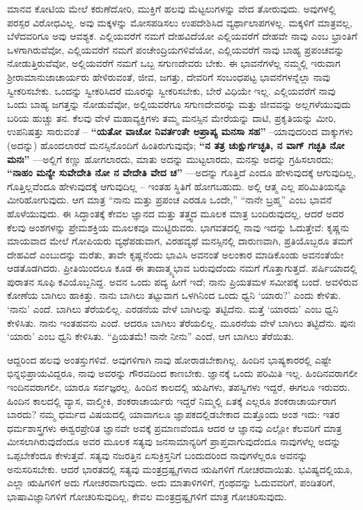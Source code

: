 \newpage

ಮಾನವ ಕೋಟಿಯ ಮೇಲೆ ಕರುಣೆದೋರಿ, ಮುಕ್ತಿಗೆ ಹಲವು ಮೆಟ್ಟಲುಗಳನ್ನು ವೇದ ತೋರುವುದು. ಅವುಗಳಲ್ಲಿ ಪರಸ್ಪರ ವಿರೋಧವಿಲ್ಲ. ಅವು ಮಕ್ಕಳನ್ನು ಮೋಸಪಡಿಸಲು ಉಪದೇಶಿಸಿದ ವ್ಯರ್ಥಾಲಾಪಗಳಲ್ಲ. ಮಕ್ಕಳಿಗೆ ಮಾತ್ರವಲ್ಲ, ಬೆಳೆದವರಿಗೂ ಅವು ಆವಶ್ಯಕ. ಎಲ್ಲಿಯವರೆಗೆ ನಮಗೆ ದೇಹವಿದೆಯೋ ಎಲ್ಲಿಯವರೆಗೆ ದೇಹವೇ ನಾವು ಎಂಬ ಭ್ರಾಂತಿಗೆ ಒಳಗಾಗಿರುವೆವೋ, ಎಲ್ಲಿಯವರೆಗೆ ನಮಗೆ ಪಂಚೇಂದ್ರಿಯಗಳಿವೆಯೋ, ಎಲ್ಲಿಯವರೆಗೆ ನಾವು ಬಾಹ್ಯ ಪ್ರಪಂಚವನ್ನು ನೋಡುತ್ತಿರುವೆವೋ, ಅಲ್ಲಿಯವರೆಗೆ ನಮಗೆ ಒಬ್ಬ ಸಗುಣದೇವರು ಬೇಕು. ಈ ಭಾವನೆಗಳೆಲ್ಲ ನಮ್ಮಲ್ಲಿ ಇರುವಾಗ ಶ‍್ರೀರಾಮಾನುಜಾಚಾರ್ಯರು ಹೇಳಿರುವಂತೆ, ಜೀವ, ಜಗತ್ತು, ದೇವರಿಗೆ ಸಂಬಂಧಪಟ್ಟ ಭಾವನೆಗಳನ್ನೆಲ್ಲಾ ನಾವು ಸ್ವೀಕರಿಸಬೇಕು. ಒಂದನ್ನು ಸ್ವೀಕರಿಸಿದರೆ ಮೂರನ್ನು ಸ್ವೀಕರಿಸಬೇಕು, ಬೇರೆ ವಿಧಿಯೇ ಇಲ್ಲ. ಎಲ್ಲಿಯವರೆಗೆ ನಾವು ಒಂದು ಬಾಹ್ಯ ಜಗತ್ತನ್ನು ನೋಡುವೆವೋ, ಅಲ್ಲಿಯವರೆಗೂ ಸಗುಣದೇವರನ್ನು ಮತ್ತು ಜೀವವನ್ನು ಅಲ್ಲಗಳೆಯುವುದು ಬರಿಯ ಹುಚ್ಚು ತನ. ಕೆಲವು ವೇಳೆ ಮಹಾವ್ಯಕ್ತಿಗಳು ತಮ್ಮ ಮನಸ್ಸಿನ ಮೇರೆಯನ್ನು ದಾಟಿ, ಪ್ರಕೃತಿಯನ್ನು ಮೀರಿ, ಉಪನಿಷತ್ತು ಸಾರುವಂತೆ – \textbf{“ಯತೋ ವಾಚೋ ನಿವರ್ತಂತೇ ಅಪ್ರಾಪ್ಯ ಮನಸಾ ಸಹ”} –ಯಾವುದರಿಂದ ವಾಕ್ಕುಗಳು (ಅದನ್ನು) ಹೊಂದಲಾರದೆ ಮನಸ್ಸಿನೊಂದಿಗೆ ಹಿಂತಿರುಗುವುವೊ; \textbf{“ನ ತತ್ರ ಚುಕ್ಷುರ್ಗಚ್ಛತಿ, ನ ವಾಗ್​ ಗಚ್ಛತಿ ನೋ ಮನಃ”} —ಅಲ್ಲಿಗೆ ಕಣ್ಣು ಹೋಗಲಾರದು, ಮಾತು ಅದನ್ನು ಮುಟ್ಟಲಾರದು, ಮನಸ್ಸು ಅದನ್ನು ಗ್ರಹಿಸಲಾರದು; \textbf{“ನಾಹಂ ಮನ್ಯೇ ಸುವೇದೇತಿ ನೋ ನ ವೇದೇತಿ ವೇದ ಚ”} —ಅದನ್ನು ಗೊತ್ತಿದೆ ಎಂದೂ ಹೇಳುವುದಕ್ಕೆ ಆಗುವುದಿಲ್ಲ, ಗೊತ್ತಿಲ್ಲವೆಂದೂ ಹೇಳುವುದಕ್ಕೆ ಆಗುವುದಿಲ್ಲ – ಇಂತಹ ಸ್ಥಿತಿಗೆ ಹೋಗಬಹುದು. ಅಲ್ಲಿ ಆತ್ಮ ಎಲ್ಲ ಪರಿಮಿತಿಯನ್ನೂ ಮೀರಿಹೋಗುವುದು. ಆಗ ಮಾತ್ರ “ನಾನು ಮತ್ತು ಪ್ರಪಂಚ ಎರಡೂ ಒಂದೇ,” “ನಾನೇ ಬ್ರಹ್ಮ” ಎಂಬ ಭಾವನೆ ಹೊಳೆಯುವುದು. ಈ ಸಿದ್ಧಾಂತಕ್ಕೆ ಕೇವಲ ಜ್ಞಾನದ ಮತ್ತು ತತ್ತ್ವದ ಮೂಲಕ ಮಾತ್ರ ಬಂದಿರುವುದಲ್ಲ, ಆದರೆ ಅದರ ಕೆಲವು ಅಂಶಗಳನ್ನು ಪ್ರೇಮಶಕ್ತಿಯ ಮೂಲಕವೂ ಮುಟ್ಟಿರುವರು. ಭಾಗವತದಲ್ಲಿ ನಾವು ಇದನ್ನು ಓದುತ್ತೇವೆ: ಕೃಷ್ಣನು ಮಾಯವಾದ ಮೇಲೆ ಗೋಪಿಯರು ವ್ಯಥೆಪಡುವಾಗ, ವಿರಹವ್ಯಥೆ ಮನಸ್ಸಿನಲ್ಲಿ ದಾರುಣವಾಗಿ, ಪ್ರತಿಯೊಬ್ಬರೂ ತಮಗೆ ದೇಹವಿದೆ ಎಂಬುದನ್ನು ಮರೆತು, ತಾವೇ ಕೃಷ್ಣನೆಂದು ಭಾವಿಸಿ ಅವನಂತೆ ಅಲಂಕಾರ ಮಾಡಿಕೊಂಡು ಅವನಂತೆಯೇ ಆಡತೊಡಗಿದರು. ಪ್ರೀತಿಯಿಂದಲೂ ಕೂಡ ಈ ತಾದಾತ್ಮ್ಯಭಾವ ಬರುವುದೆಂದು ನಮಗೆ ಗೊತ್ತಾಗುತ್ತದೆ. ಪರ್ಷಿಯಾದಲ್ಲಿ ಪುರಾತನ ಸೂಫಿ ಕವಿಯೊಬ್ಬನಿದ್ದ. ಅವನ ಒಂದು ಪದ್ಯ ಹೀಗೆ ಇದೆ; ನಾನು ಪ್ರಿಯತಮಳ ಸಮೀಪಕ್ಕೆ ಬಂದೆ. ಅವಳಿರುವ ಕೋಣೆಯ ಬಾಗಿಲು ಹಾಕಿತ್ತು. ನಾನು ಬಾಗಿಲು ತಟ್ಟುವಾಗ ಒಳಗಿನಿಂದ ಒಂದು ಧ್ವನಿ ‘ಯಾರು?’ ಎಂದು ಕೇಳಿತು. ‘ನಾನು’ ಎಂದೆ. ಬಾಗಿಲು ತೆರೆಯಲಿಲ್ಲ. ಎರಡನೆಯ ವೇಳೆ ಬಾಗಿಲನ್ನು ತಟ್ಟಿದೆನು. ಮತ್ತೆ ‘ಯಾರದು’ ಎಂಬ ಧ್ವನಿ ಕೇಳಿಸಿತು. ನಾನು ಇಂತಹವನು ಎಂದೆ. ಆದರೂ ಬಾಗಿಲು ತೆರೆಯಲಿಲ್ಲ. ಮೂರನೆಯ ವೇಳೆ ಬಾಗಿಲು ತಟ್ಟಿದೆನು. ಪುನಃ ‘ಯಾರು’ ಎಂಬ ಧ್ವನಿ ಕೇಳಿಸಿತು. “ಪ್ರಿಯತಮೆ! ನಾನೇ ನೀನು” ಎಂದೆ, ಆಗ ಬಾಗಿಲು ತೆರೆಯಿತು.

\vskip   4pt

ಆದ್ದರಿಂದ ಹಲವು ಅಂತಸ್ತುಗಳಿವೆ. ಅವುಗಳಿಗಾಗಿ ನಾವು ಹೋರಾಡಬೇಕಾಗಿಲ್ಲ. ಹಿಂದಿನ ಭಾಷ್ಯಕಾರರಲ್ಲಿ ಎಷ್ಟೇ ಭಿನ್ನಭಿಪ್ರಾಯವಿದ್ದರೂ, ನಾವು ಅವರನ್ನು ಗೌರವದಿಂದ ಕಾಣಬೇಕು. ಜ್ಞಾನಕ್ಕೆ ಒಂದು ಪರಿಮಿತಿ ಇಲ್ಲ. ಹಿಂದಿನವರಾಗಲೀ ಇಂದಿನವರಾಗಲೀ, ಯಾರೂ ಸರ್ವಜ್ಞರಲ್ಲ. ಹಿಂದಿನ ಕಾಲದಲ್ಲಿ ಋಷಿಗಳು, ತಪಸ್ವಿಗಳು ಇದ್ದರೆ, ಈಗಲೂ ಇರುವರು. ಹಿಂದಿನ ಕಾಲದಲ್ಲಿ ವ್ಯಾಸ, ವಾಲ್ಮೀಕಿ, ಶಂಕರಾಚಾರ್ಯರು ಇದ್ದರೆ ನಿಮ್ಮಲ್ಲಿ ಏತಕ್ಕೆ ಎಲ್ಲರೂ ಶಂಕರಾಚಾರ್ಯರಾಗ ಬಾರದು? ನಮ್ಮ ಧರ್ಮದ ವಿಷಯದಲ್ಲಿ ಯಾವಾಗಲೂ ಜ್ಞಾಪಕದಲ್ಲಿಡಬೇಕಾದ ಮತ್ತೊಂದು ಅಂಶ ಇದು: ಇತರ ಧರ್ಮಶಾಸ್ತ್ರಗಳು ಈಶ್ವರಪ್ರೇರಿತ ಜ್ಞಾನವೇ ಅವಕ್ಕೆ ಪ್ರಮಾಣವೆಂದೂ ಆದರ ಆ ಜ್ಞಾನವು ಎಲ್ಲೋ ಕೆಲವರಿಗೆ ಮಾತ್ರ ಮೀಸಲಾಗಿರುವುದೆಂದೂ ಅವರ ಮೂಲಕ ಸತ್ಯವು ಜನಸಾಮಾನ್ಯರಿಗೆ ಪ್ರಾಪ್ತವಾಗುವುದೆಂದೂ ನಾವುಗಳೆಲ್ಲ ಅದನ್ನು ಒಪ್ಪಬೇಕೆಂದೂ ಕೇಳುತ್ತವೆ. ಸತ್ಯವು ನಜರತ್ತಿನ ಏಸುಕ್ರಿಸ್ತನಿಗೆ ಬಂದುದರಿಂದ ನಾವುಗಳೆಲ್ಲರೂ ಅವನನ್ನು ಅನುಸರಿಸಬೇಕು. ಆದರೆ ಭಾರತದಲ್ಲಿ ಸತ್ಯವು ಮಂತ್ರದ್ರಷ್ಟೃಗಳಾದ ಋಷಿಗಳಿಗೆ ಗೋಚರವಾಯಿತು. ಭವಿಷ್ಯದಲ್ಲಿಯೂ, ಎಲ್ಲಾ ಋಷಿಗಳಿಗೆ ಅದು ಗೋಚರವಾಗುವುದು. ಅದು ಮಾತಾಳಿಗಳಿಗೆ, ಗ್ರಂಥವನ್ನು ಓದುವವರಿಗೆ, ಪಂಡಿತರಿಗೆ, ಭಾಷಾವಿಜ್ಞಾನಿಗಳಿಗೆ ಗೋಚರಿಸುವುದಿಲ್ಲ, ಕೇವಲ ಮಂತ್ರದ್ರಷ್ಟೃಗಳಿಗೆ ಮಾತ್ರ ಗೋಚರಿಸುವುದು.

